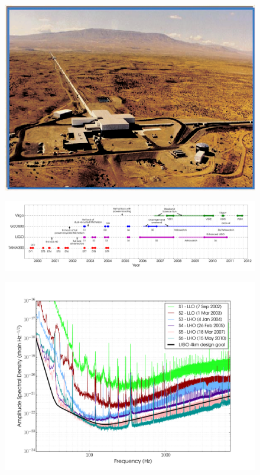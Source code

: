 \begin{figure}[]
\begin{center}
\includegraphics[width=1\columnwidth]{./figures/fig7/fig7}
\caption{ \protect}
\end{center}
\end{figure}


\begin{figure}[]
\begin{center}
\includegraphics[width=1\columnwidth]{./figures/runtimes/runtimes}
\caption{ \protect}
\end{center}
\end{figure}


\begin{figure}[]
\begin{center}
\includegraphics[width=1\columnwidth]{./figures/LIGOSrunASDs/LIGOSrunASDs}
\caption{ \protect}
\end{center}
\end{figure}


